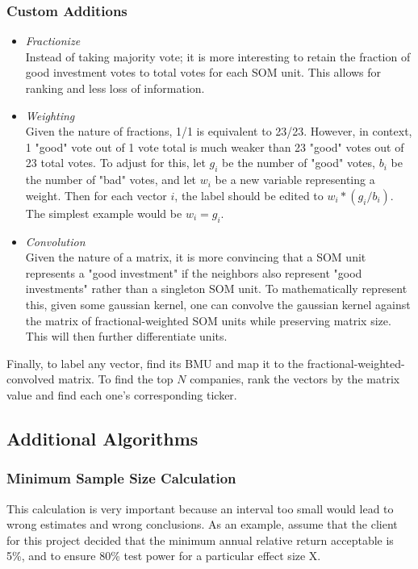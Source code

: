 \documentclass[preprint,12pt]{elsarticle}
\begin{document}
\subsubsection{Custom Additions}
\begin{itemize}
	\item \textit{Fractionize} \\
    	Instead of taking majority vote; it is more interesting to retain the fraction of good investment votes to total votes for each SOM unit. This allows for ranking and less loss of information.
        
	\item \textit{Weighting} \\
    	Given the nature of fractions, 1/1 is equivalent to 23/23. However, in context, 1 "good" vote out of 1 vote total is much weaker than 23 "good" votes out of 23 total votes. To adjust for this, let $g_{i}$ be the number of "good" votes, $b_{i}$ be the number of "bad" votes, and let $w_{i}$ be a new variable representing a weight. Then for each vector $i$, the label should be edited to $w_{i} * (g_{i} / b_{i})$. The simplest example would be $w_{i} = g_{i}$.
        
    \item \textit{Convolution} \\
    	Given the nature of a matrix, it is more convincing that a SOM unit represents a "good investment" if the neighbors also represent "good investments" rather than a singleton SOM unit. To mathematically represent this, given some gaussian kernel, one can convolve the gaussian kernel against the matrix of fractional-weighted SOM units while preserving matrix size. This will then further differentiate units. 
\end{itemize}

Finally, to label any vector, find its BMU and map it to the fractional-weighted-convolved matrix. To find the top $N$ companies, rank the vectors by the matrix value and find each one's corresponding ticker. 

\subsection{Additional Algorithms}
\subsubsection{Minimum Sample Size Calculation}
This calculation is very important because an interval too small would lead to wrong estimates and wrong conclusions. As an example, assume that the client for this project decided that the minimum annual relative return acceptable is 5\%, and to ensure 80\% test power for a particular effect size X. \\
\end{document}
